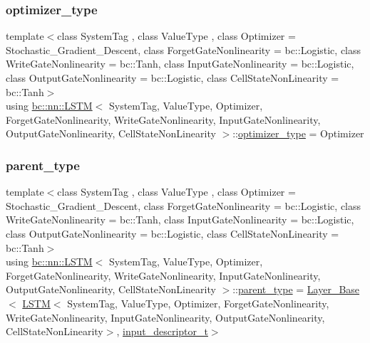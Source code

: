 \mbox{\label{structbc_1_1nn_1_1LSTM_adc4d4ca749708bacc70cf57547fd5c08}} 
\subsubsection{\texorpdfstring{optimizer\+\_\+type}{optimizer\_type}}
{\footnotesize\ttfamily template$<$class System\+Tag , class Value\+Type , class Optimizer  = Stochastic\+\_\+\+Gradient\+\_\+\+Descent, class Forget\+Gate\+Nonlinearity  = bc\+::\+Logistic, class Write\+Gate\+Nonlinearity  = bc\+::\+Tanh, class Input\+Gate\+Nonlinearity  = bc\+::\+Logistic, class Output\+Gate\+Nonlinearity  = bc\+::\+Logistic, class Cell\+State\+Non\+Linearity  = bc\+::\+Tanh$>$ \\
using \hyperlink{structbc_1_1nn_1_1LSTM}{bc\+::nn\+::\+L\+S\+TM}$<$ System\+Tag, Value\+Type, Optimizer, Forget\+Gate\+Nonlinearity, Write\+Gate\+Nonlinearity, Input\+Gate\+Nonlinearity, Output\+Gate\+Nonlinearity, Cell\+State\+Non\+Linearity $>$\+::\hyperlink{structbc_1_1nn_1_1LSTM_adc4d4ca749708bacc70cf57547fd5c08}{optimizer\+\_\+type} =  Optimizer}

\mbox{\label{structbc_1_1nn_1_1LSTM_af5aae30f99bb8b7706a748e660ba2975}} 
\subsubsection{\texorpdfstring{parent\+\_\+type}{parent\_type}}
{\footnotesize\ttfamily template$<$class System\+Tag , class Value\+Type , class Optimizer  = Stochastic\+\_\+\+Gradient\+\_\+\+Descent, class Forget\+Gate\+Nonlinearity  = bc\+::\+Logistic, class Write\+Gate\+Nonlinearity  = bc\+::\+Tanh, class Input\+Gate\+Nonlinearity  = bc\+::\+Logistic, class Output\+Gate\+Nonlinearity  = bc\+::\+Logistic, class Cell\+State\+Non\+Linearity  = bc\+::\+Tanh$>$ \\
using \hyperlink{structbc_1_1nn_1_1LSTM}{bc\+::nn\+::\+L\+S\+TM}$<$ System\+Tag, Value\+Type, Optimizer, Forget\+Gate\+Nonlinearity, Write\+Gate\+Nonlinearity, Input\+Gate\+Nonlinearity, Output\+Gate\+Nonlinearity, Cell\+State\+Non\+Linearity $>$\+::\hyperlink{structbc_1_1nn_1_1LSTM_af5aae30f99bb8b7706a748e660ba2975}{parent\+\_\+type} =  \hyperlink{structbc_1_1nn_1_1Layer__Base}{Layer\+\_\+\+Base}$<$ \hyperlink{structbc_1_1nn_1_1LSTM}{L\+S\+TM}$<$ System\+Tag, Value\+Type, Optimizer, Forget\+Gate\+Nonlinearity, Write\+Gate\+Nonlinearity, Input\+Gate\+Nonlinearity, Output\+Gate\+Nonlinearity, Cell\+State\+Non\+Linearity$>$, \hyperlink{structbc_1_1nn_1_1LSTM_aab44654006b4410cc4a26d2a592776e1}{input\+\_\+descriptor\+\_\+t}$>$}

